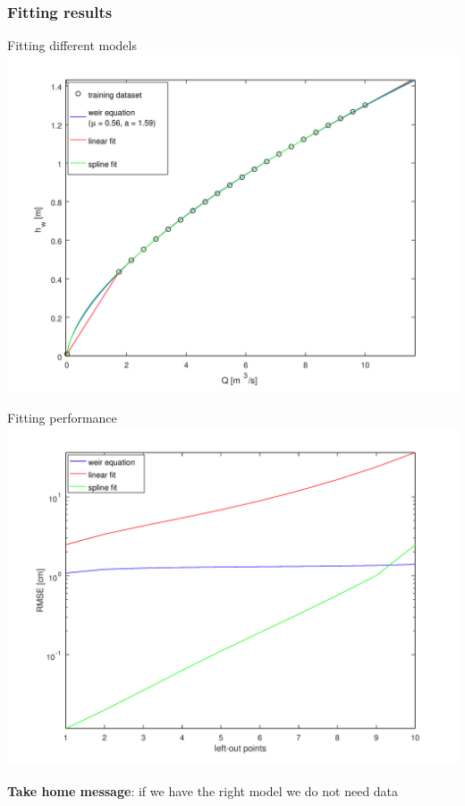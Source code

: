 \documentclass[xcolor=dvipsnames, USenglish]{beamer}  %
\begin{document}
  \begin{frame}
    \frametitle{Fitting results}
    \begin{minipage}{.5\textwidth}
      \centering
      \small{Fitting different models}\\
      \includegraphics[width=\textwidth]{img/fitting_results.png}
    \end{minipage}%
    \begin{minipage}{.5\textwidth}
      \centering
      \small{Fitting performance}\\
      \includegraphics[width=\textwidth]{img/fitting_errors.png}
    \end{minipage}
    \vfill
    \pause
    \small{\textbf{Take home message}: if we have the right model we do not need data}
  \end{frame}
\end{document}
